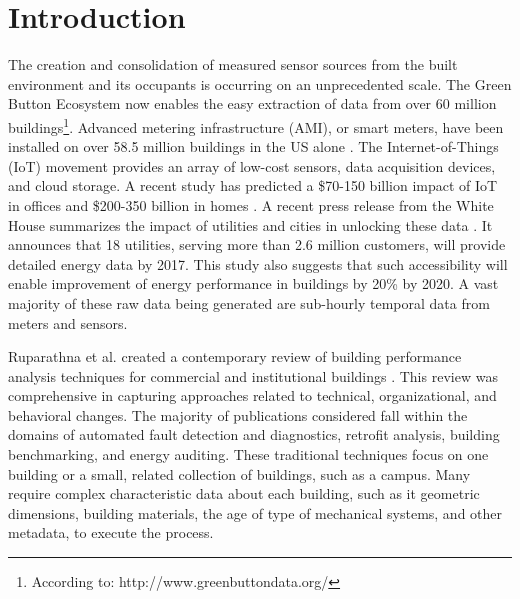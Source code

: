 \documentclass[preprint,12pt,3p]{elsarticle}
\begin{document}


\section{Introduction}
\label{Introduction}
The creation and consolidation of measured sensor sources from the built environment and its occupants is occurring on an unprecedented scale. The Green Button Ecosystem now enables the easy extraction of data from over 60 million buildings\footnote{According to: http://www.greenbuttondata.org/}. Advanced metering infrastructure (AMI), or smart meters, have been installed on over 58.5 million buildings in the US alone \cite{energy_information_administration_how_2015}. The Internet-of-Things (IoT) movement provides an array of low-cost sensors, data acquisition devices, and cloud storage. A recent study has predicted a \$70-150 billion impact of IoT in offices and \$200-350 billion in homes \cite{james_manyika_unlocking_2015}. A recent press release from the White House summarizes the impact of utilities and cities in unlocking these data \cite{the_white_house_fact_2016}. It announces that 18 utilities, serving more than 2.6 million customers, will provide detailed energy data by 2017. This study also suggests that such accessibility will enable improvement of energy performance in buildings by 20\% by 2020. A vast majority of these raw data being generated are sub-hourly temporal data from meters and sensors. 

Ruparathna et al. created a contemporary review of building performance analysis techniques for commercial and institutional buildings \cite{ruparathna_improving_2016}. This review was comprehensive in capturing approaches related to technical, organizational, and behavioral changes. The majority of publications considered fall within the domains of automated fault detection and diagnostics, retrofit analysis, building benchmarking, and energy auditing. These traditional techniques focus on one building or a small, related collection of buildings, such as a campus. Many require complex characteristic data about each building, such as it geometric dimensions, building materials, the age of type of mechanical systems, and other metadata, to execute the process. 
\end{document}
